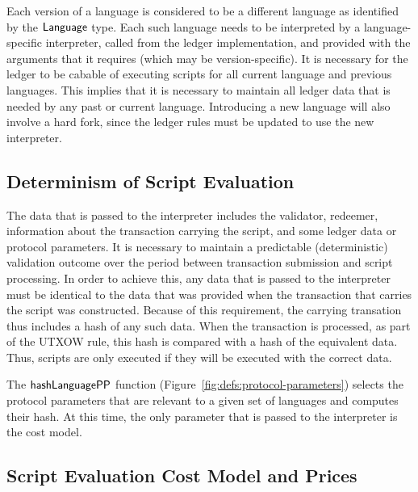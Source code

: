 Each version of a language is considered to be a different language as identified by the $\mathsf{Language}$ type.
Each such language needs to be interpreted by a language-specific interpreter, called from the ledger implementation,
and provided with the arguments that it requires (which may be version-specific).
It is necessary for the ledger to be cabable of executing scripts for all current language and previous languages.
This implies that it is necessary to maintain all ledger
data that is needed by any past or current language. Introducing a new language will also
involve a hard fork, since the ledger rules must be updated to use the new interpreter.

\subsection{Determinism of Script Evaluation}
\label{sec:determinism}

The data that is passed to the interpreter
includes the validator, redeemer, information about the transaction carrying
the script, and some ledger data or protocol parameters.
It is necessary to maintain a predictable (deterministic) validation outcome over the period between transaction
submission and script processing.
%
In order to achieve this,
any data that is passed to the interpreter must be
identical to the data that was provided when the transaction that carries the script was
constructed.
Because of this requirement, the carrying transation thus includes a hash of any such data.
When the transaction is processed, as part of the UTXOW rule, this hash is compared with a hash of the equivalent data. Thus, scripts are only executed if they will be executed with the correct data.

The $\mathsf{hashLanguagePP}$ function (Figure~\ref{fig:defs:protocol-parameters}) selects the protocol parameters that are relevant to
a given set of languages and computes their hash.
%
At this time, the only parameter that is passed to the interpreter is the cost model.

\subsection{Script Evaluation Cost Model and Prices}
\label{sec:cost-mod}

